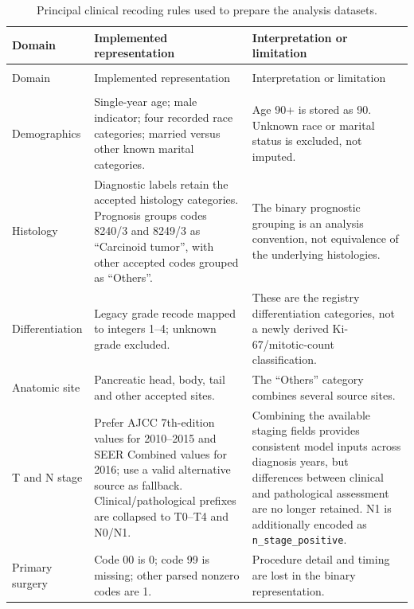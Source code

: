 \begingroup
\small
\setlength{\tabcolsep}{5pt}
\begin{longtable}{@{}>{\RaggedRight\arraybackslash}p{3.1cm}>{\RaggedRight\arraybackslash}p{6.3cm}>{\RaggedRight\arraybackslash}p{5.1cm}@{}}
\caption{Principal clinical recoding rules used to prepare the analysis
datasets.}
\label{tab:data:recoding}\\
\toprule
Domain & Implemented representation & Interpretation or limitation \\
\midrule
\endfirsthead
\multicolumn{3}{l}{\textit{Table \thetable\ continued}}\\
\toprule
Domain & Implemented representation & Interpretation or limitation \\
\midrule
\endhead
\midrule
\multicolumn{3}{r}{\textit{Continued on next page}}\\
\endfoot
\bottomrule
\endlastfoot
Demographics & Single-year age; male indicator; four recorded race categories;
married versus other known marital categories. & Age 90+ is stored as 90.
Unknown race or marital status is excluded, not imputed. \\[0.6em]
Histology & Diagnostic labels retain the accepted histology categories.
Prognosis groups codes 8240/3 and 8249/3 as ``Carcinoid tumor'', with other
accepted codes grouped as ``Others''. & The binary prognostic grouping is an
analysis convention, not equivalence of the underlying histologies. \\[0.6em]
Differentiation & Legacy grade recode mapped to integers 1--4; unknown grade
excluded. & These are the registry differentiation categories, not a newly
derived Ki-67/mitotic-count classification. \\[0.6em]
Anatomic site & Pancreatic head, body, tail and other accepted sites. &
The ``Others'' category combines several source sites. \\[0.6em]
T and N stage & Prefer AJCC 7th-edition values for 2010--2015 and SEER Combined
values for 2016; use a valid alternative source as fallback. Clinical/pathological
prefixes are collapsed to T0--T4 and N0/N1. & Combining the available staging
fields provides consistent model inputs across diagnosis years, but differences
between clinical and pathological assessment are no longer retained. N1 is
additionally encoded as \texttt{n\_stage\_positive}. \\[0.6em]
Primary surgery & Code 00 is 0; code 99 is missing; other parsed nonzero codes
are 1. & Procedure detail and timing are lost in the binary representation. \\[0.6em]

\end{longtable}

